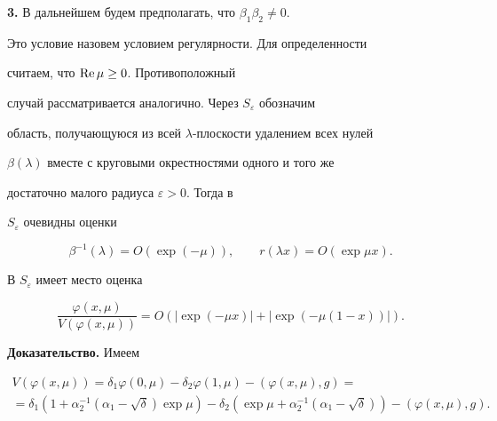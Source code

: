 \medskip





{\bf 3.} В дальнейшем будем предполагать, что $\beta_1\beta_2\ne 0$.


Это условие назовем условием регулярности. Для определенности


считаем, что $\operatorname{Re}\mu \ge0$. Противоположный


случай рассматривается аналогично. Через $S_\varepsilon$ обозначим


область, получающуюся из всей $\lambda$-плоскости удалением всех нулей


$\beta(\lambda)$ вместе с круговыми окрестностями одного и того же


достаточно малого радиуса $\varepsilon>0$. Тогда в


$S_\varepsilon$ очевидны оценки


\begin{equation}


\beta^{-1}(\lambda)=O(\exp(-\mu)),\qquad r(\lambda x)=O(\exp\mu x).


\end{equation}





\begin{lem}


В $S_\varepsilon$ имеет место оценка


$$


\frac{\varphi(x,\mu)}{V(\varphi(x,\mu))}=O(|\exp(-\mu x)|+


|\exp(-\mu (1-x))|).


$$


\end{lem}





{\bf Доказательство.} Имеем


\begin{multline*}


V(\varphi(x,\mu))=\delta_1\varphi(0,\mu)- \delta_2\varphi(1,\mu)-


(\varphi(x,\mu),g)= \\


=\delta_1(1+\alpha_2^{-1}(\alpha_1-\sqrt\delta)\exp\mu)-


\delta_2(\exp\mu+\alpha_2^{-1}(\alpha_1-\sqrt\delta))-


(\varphi(x,\mu),g).


\end{multline*}


